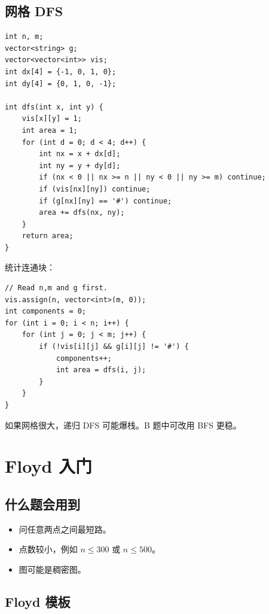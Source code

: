 \subsection{网格 DFS}

\begin{lstlisting}
int n, m;
vector<string> g;
vector<vector<int>> vis;
int dx[4] = {-1, 0, 1, 0};
int dy[4] = {0, 1, 0, -1};

int dfs(int x, int y) {
    vis[x][y] = 1;
    int area = 1;
    for (int d = 0; d < 4; d++) {
        int nx = x + dx[d];
        int ny = y + dy[d];
        if (nx < 0 || nx >= n || ny < 0 || ny >= m) continue;
        if (vis[nx][ny]) continue;
        if (g[nx][ny] == '#') continue;
        area += dfs(nx, ny);
    }
    return area;
}
\end{lstlisting}

统计连通块：

\begin{lstlisting}
// Read n,m and g first.
vis.assign(n, vector<int>(m, 0));
int components = 0;
for (int i = 0; i < n; i++) {
    for (int j = 0; j < m; j++) {
        if (!vis[i][j] && g[i][j] != '#') {
            components++;
            int area = dfs(i, j);
        }
    }
}
\end{lstlisting}

如果网格很大，递归 DFS 可能爆栈。B 题中可改用 BFS 更稳。

\section{Floyd 入门}\label{sec:06-20}

\subsection{什么题会用到}

\begin{itemize}
  \item 问任意两点之间最短路。
  \item 点数较小，例如 $n \le 300$ 或 $n \le 500$。
  \item 图可能是稠密图。
\end{itemize}

\subsection{Floyd 模板}

